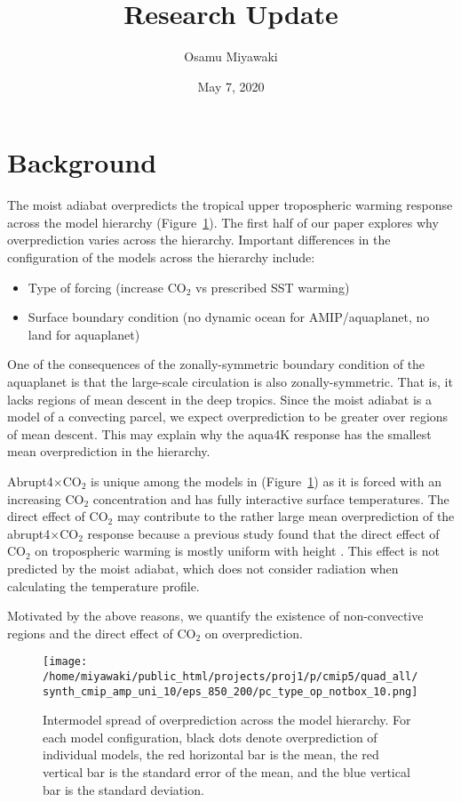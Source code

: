 \documentclass{article}
\title{Research Update}
\author{Osamu Miyawaki}
\date{May 7, 2020}
\begin{document}
\maketitle

\section{Background}
The moist adiabat overpredicts the tropical upper tropospheric warming response across the model hierarchy (Figure~\ref{fig:spread}). The first half of our paper explores why overprediction varies across the hierarchy. Important differences in the configuration of the models across the hierarchy include:
\begin{itemize}
    \item Type of forcing (increase CO$_2$ vs prescribed SST warming)
    \item Surface boundary condition (no dynamic ocean for AMIP/aquaplanet, no land for aquaplanet)
\end{itemize}
One of the consequences of the zonally-symmetric boundary condition of the aquaplanet is that the large-scale circulation is also zonally-symmetric. That is, it lacks regions of mean descent in the deep tropics.  Since the moist adiabat is a model of a convecting parcel, we expect overprediction to be greater over regions of mean descent. This may explain why the aqua4K response has the smallest mean overprediction in the hierarchy. 

Abrupt4$\times$CO$_2$ is unique among the models in (Figure~\ref{fig:spread}) as it is forced with an increasing CO$_2$ concentration and has fully interactive surface temperatures. The direct effect of CO$_2$ may contribute to the rather large mean overprediction of the abrupt4$\times$CO$_2$ response because a previous study found that the direct effect of CO$_2$ on tropospheric warming is mostly uniform with height \cite{he-soden-2015}. This effect is not predicted by the moist adiabat, which does not consider radiation when calculating the temperature profile.

Motivated by the above reasons, we quantify the existence of non-convective regions and the direct effect of CO$_2$ on overprediction.

\begin{figure}
    \centering
    \texttt{[image: /home/miyawaki/public\_html/projects/proj1/p/cmip5/quad\_all/synth\_cmip\_amp\_uni\_10/eps\_850\_200/pc\_type\_op\_notbox\_10.png]}
    \caption{Intermodel spread of overprediction across the model hierarchy. For each model configuration, black dots denote overprediction of individual models, the red horizontal bar is the mean, the red vertical bar is the standard error of the mean, and the blue vertical bar is the standard deviation.}
    \label{fig:spread}
\end{figure}
\end{document}
